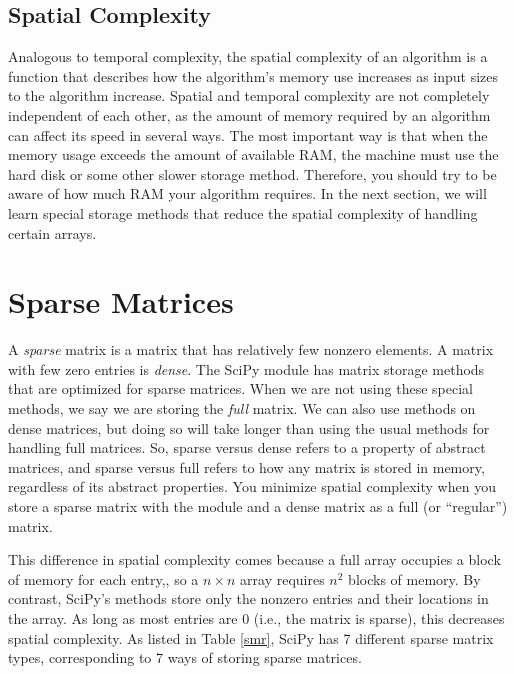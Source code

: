 \subsection*{Spatial Complexity}
Analogous to temporal complexity, the spatial complexity of an algorithm is a function that describes how the algorithm's memory use increases as input sizes to the algorithm increase. Spatial and temporal complexity are not completely independent of each other, as the amount of memory required by an algorithm can affect its speed in several ways. The most important way is that when the memory usage exceeds the amount of available RAM, the machine must use the hard disk or some other slower storage method. Therefore, you should try to be aware of how much RAM your algorithm requires. In the next section, we will learn special storage methods that reduce the spatial complexity of handling certain arrays.

\section*{Sparse Matrices}
A \emph{sparse} matrix is a matrix that has relatively few nonzero elements. A matrix with few zero entries is \emph{dense}. The SciPy module  has matrix storage methods that are optimized for sparse matrices. When we are not using these special methods, we say we are storing the \emph{full} matrix. We can also use  methods on dense matrices, but doing so will take longer than using the usual methods for handling full matrices. So, sparse versus dense refers to a property of abstract matrices, and sparse versus full refers to how any matrix is stored in memory, regardless of its abstract properties. You minimize spatial complexity when you store a sparse matrix with the  module and a dense matrix as a full (or ``regular'') matrix.

This difference in spatial complexity comes because a full array occupies a block of memory for each entry,, so a $n \times n$ array requires $n^2$ blocks of memory. By contrast, SciPy's  methods store only the nonzero entries and their locations in the array. As long as most entries are 0 (i.e., the matrix is sparse), this decreases spatial complexity. As listed in Table \ref{smr}, SciPy has 7 different sparse matrix types, corresponding to 7 ways of storing sparse matrices.



